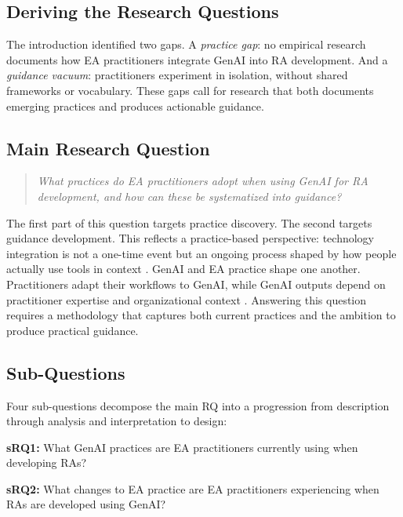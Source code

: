 \subsection{Deriving the Research Questions}\label{sec:research-question}

The introduction identified two gaps. A \emph{practice gap}: no empirical
research documents how EA practitioners integrate GenAI into RA development.
And a \emph{guidance vacuum}: practitioners experiment in isolation, without
shared frameworks or vocabulary. These gaps call for research that both
documents emerging practices and produces actionable guidance.

\subsection{Main Research Question}

\begin{quote}
\textit{What practices do EA practitioners adopt when using GenAI for RA development,
and how can these be systematized into guidance?}
\end{quote}

The first part of this question targets practice discovery. The second targets
guidance development. This reflects a practice-based perspective: technology
integration is not a one-time event but an ongoing process shaped by how people
actually use tools in context \parencite{feldman_theorizing_2011,
orlikowski_using_2000}. GenAI and EA practice shape one another. Practitioners
adapt their workflows to GenAI, while GenAI outputs depend on practitioner
expertise and organizational context \parencite{orlikowski_sociomaterial_2007}.
Answering this question requires a methodology that captures both current
practices and the ambition to produce practical guidance.

\subsection{Sub-Questions}\label{subsec:sub-questions}

Four sub-questions decompose the main RQ into a progression from description
through analysis and interpretation to design:

\vspace{0.5em}
\noindent\textbf{sRQ1:} What GenAI practices are EA practitioners currently using when developing RAs?

\vspace{0.5em}
\noindent\textbf{sRQ2:} What changes to EA practice are EA practitioners experiencing when RAs are developed using GenAI?

